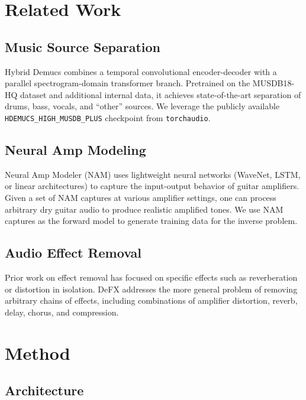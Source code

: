 \documentclass[11pt,twocolumn]{article}
\begin{document}
\section{Related Work}

\subsection{Music Source Separation}

Hybrid Demucs \cite{defossez2021hybrid, rouard2023hybrid} combines a temporal convolutional encoder-decoder with a parallel spectrogram-domain transformer branch. Pretrained on the MUSDB18-HQ dataset and additional internal data, it achieves state-of-the-art separation of drums, bass, vocals, and ``other'' sources. We leverage the publicly available \texttt{HDEMUCS\_HIGH\_MUSDB\_PLUS} checkpoint from \texttt{torchaudio}.

\subsection{Neural Amp Modeling}

Neural Amp Modeler (NAM) \cite{nam2023} uses lightweight neural networks (WaveNet, LSTM, or linear architectures) to capture the input-output behavior of guitar amplifiers. Given a set of NAM captures at various amplifier settings, one can process arbitrary dry guitar audio to produce realistic amplified tones. We use NAM captures as the forward model to generate training data for the inverse problem.

\subsection{Audio Effect Removal}

Prior work on effect removal has focused on specific effects such as reverberation \cite{su2020hifi} or distortion in isolation. DeFX addresses the more general problem of removing arbitrary chains of effects, including combinations of amplifier distortion, reverb, delay, chorus, and compression.

\section{Method}

\subsection{Architecture}
\end{document}
